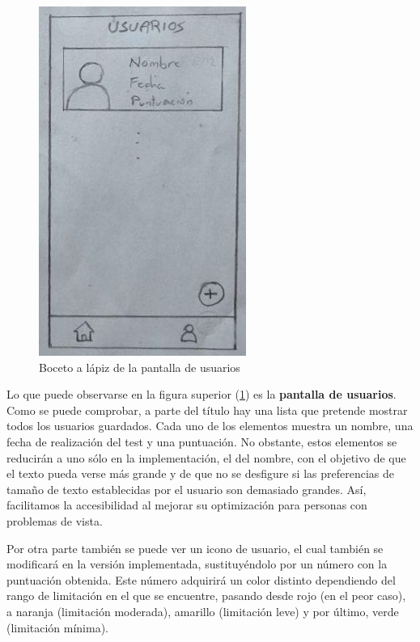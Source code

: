 \begin{figure}[H]
	\centering
	\includegraphics[scale=1]{imagenes/boceto_usuarios.jpg}
	\caption{Boceto a lápiz de la pantalla de usuarios\label{fig:boceto_usuarios}}
\end{figure}

Lo que puede observarse en la figura superior (\ref{fig:boceto_usuarios}) es la \textbf{pantalla de usuarios}. Como se puede comprobar, a parte del título hay una lista que pretende mostrar todos los usuarios guardados. Cada uno de los elementos muestra un nombre, una fecha de realización del test y una puntuación. No obstante, estos elementos se reducirán a uno sólo en la implementación, el del nombre, con el objetivo de que el texto pueda verse más grande y de que no se desfigure si las preferencias de tamaño de texto establecidas por el usuario son demasiado grandes. Así, facilitamos la accesibilidad al mejorar su optimización para personas con problemas de vista.

Por otra parte también se puede ver un icono de usuario, el cual también se modificará en la versión implementada, sustituyéndolo por un número con la puntuación obtenida. Este número adquirirá un color distinto dependiendo del rango de limitación en el que se encuentre, pasando desde rojo (en el peor caso), a naranja (limitación moderada), amarillo (limitación leve) y por último, verde (limitación mínima).

